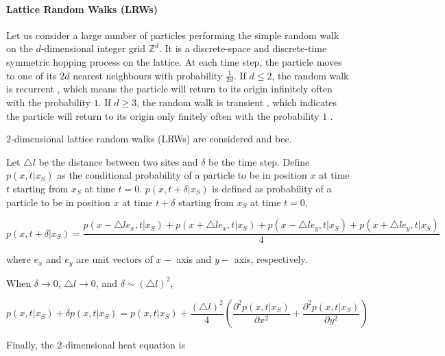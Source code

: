 \paragraph{Lattice Random Walks (LRWs)}

Let us consider a large number of particles performing the simple
random walk on the $d$-dimensional integer grid $\mathbb{Z}^d$. It is
a discrete-space and discrete-time symmetric hopping
process \cite{redner2001guide} on the lattice. At each time step, the
particle moves to one of its $2d$ nearest neighbours with probability
$\frac{1}{2d}$. If $d \leq 2$, the random walk is
recurrent \cite{hughes1998random}, which means the particle will
return to its origin infinitely often with the probability $1$. If
$d \geq 3$, the random walk is transient \cite{hughes1998random},
which indicates the particle will return to its origin only finitely
often with the probability $1$ \cite{hughes1998random}.

$2$-dimensional lattice random walks
(LRWs) are considered and bec.

Let $\triangle l$ be the distance between
two sites and $\delta$ be the time step. Define $p(x,t| x_{S})$ as the
conditional probability of a particle to be in position $x$ at time
$t$ starting from $x_{S}$ at time $t=0$. $p(x, t + \delta |x_{S})$ is
defined as probability of a particle to be in position $x$ at time $t
+ \delta$ starting from $x_{S}$ at time $t=0$, \cite{lawler2010random}


\begin{equation}\label{eq:lrws_next}
  p(x, t + \delta | x_{S}) = \frac{p(x - \triangle l e_{x}, t| x_{S}) +
    p(x + \triangle l e_{x}, t| x_{S}) + p(x - \triangle l e_{y}, t|
    x_{S}) + p(x + \triangle l e_{y}, t| x_{S})}{4}
\end{equation}

where $e_x$ and $e_y$ are unit vectors of $x-$ axis and $y-$ axis, respectively.


When $\delta \rightarrow 0$, $\triangle l \rightarrow 0$, and $\delta \sim (\triangle l)^2$, 

\begin{equation}\label{eq:lrws_prob}
  p(x, t | x_{S}) + \delta p(x, t | x_{S}) = p(x, t | x_{S}) +
  \frac{(\triangle l)^2}{4} (\frac{\partial ^2 p(x, t|
    x_{S})}{\partial x^2} + \frac{\partial^2 p (x, t| x_{S})}{\partial
    y^2})
\end{equation}

Finally, the $2$-dimensional heat equation is

